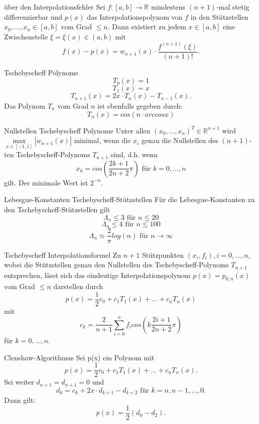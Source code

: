 \begin{flashcard}[Satz]{über den Interpolationsfehler}
Sei $f: [a,b] \rightarrow \mathbb{R}$ mindestens $(n+1)$-mal stetig differenzierbar und $p(x)$
das Interpolationspolynom von $f$ in den Stützstellen $x_0, \ldots , x_n \in [a,b]$ vom Grad $\leq n$.
Dann existiert zu jedem $x \in [a,b]$ eine Zwischenstelle $\xi = \xi(x) \in (a,b)$ mit
$$
	f(x)-p(x) = w_{n+1}(x) \cdot \frac{f^{(n+1)}(\xi)}{(n+1)!}.
$$
\end{flashcard}

\begin{flashcard}[Definition]{Tschebyscheff Polynome}
$$
	T_0(x) = 1
$$
$$
	T_1(x) = x
$$
$$
	T_{n+1}(x) = 2x \cdot T_n(x) - T_{n-1}(x).
$$
Das Polynom $T_n$ vom Grad $n$ ist ebenfalls gegeben durch:
$$
	T_n(x) = cos(n \cdot arccos x)
$$
\end{flashcard}

\begin{flashcard}[Satz]{Nullstellen Tschebyscheff Polynome}
Unter allen $(x_0, \ldots, x_n)^T \in \mathbb{R}^{n+1}$ wird $\max\limits_{x \in [-1,1]} |w_{n+1}(x)|$
minimal, wenn die $x_i$ genau die Nullstellen des $(n+1)$-ten Tschebyscheff-Polynoms $T_{n+1}$ sind, d.h. wenn
$$
	x_k = cos\left(\frac{2k+1}{2n+2} \pi\right) \text{ für } k=0, \ldots , n
$$
gilt. Der minimale Wert ist $2^{-n}$.
\end{flashcard}

\begin{flashcard}[Satz]{Lebesgue-Konstanten Tschebyscheff-Stützstellen}
Für die Lebesgue-Konstanten zu den Tschebyscheff-Stützstellen gilt
$$
	\Lambda_n \leq 3 \text{ für } n \leq 20
$$
$$
	\Lambda_n \leq 4 \text{ für } n \leq 100
$$
$$
	\Lambda_n \approx \frac{2}{\pi} log(n) \text{ für }  n \rightarrow \infty
$$
\end{flashcard}

\begin{flashcard}[Satz]{Tschebyscheff Interpolationsformel}
Zu $n+1$ Stützpunkten $(x_i, f_i), i = 0, \ldots , n$, wobei die Stützstellen genau den Nullstellen
des Tschebyscheff-Polynoms $T_{n+1}$ entsprechen, lässt sich das eindeutige Interpolationspolynom
$p(x) = p_{0,n}(x)$ vom Grad $\leq n$ darstellen durch
$$
	p(x) = \frac{1}{2}c_0 + c_1T_1(x) + \ldots + c_nT_n(x)
$$
mit
$$
	c_k = \frac{2}{n+1}\sum_{i=0}^n f_i cos \left(k \frac{2i+1}{2n+2}\pi \right)
$$
für $k=0, \ldots, n$.
\end{flashcard}

\begin{flashcard}[Satz]{Clenshaw-Algorithmus}
Sei p(x) ein Polynom mit
$$
	p(x) = \frac{1}{2}c_0 + c_1T_1(x) + \ldots + c_nT_n(x).
$$
Sei weiter $d_{n+1} = d_{n+1} = 0$ und
$$
	d_k = c_k + 2x \cdot d_{k+1} - d_{k+2} \text{ für } k = n, n-1, \ldots, 0.
$$
Dann gilt:
$$
	p(x) = \frac{1}{2}(d_0 - d_2).
$$
\end{flashcard}

